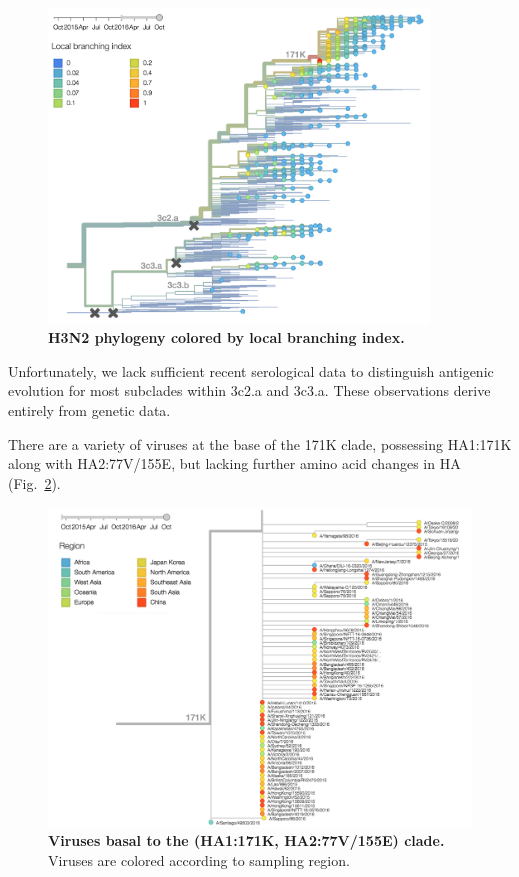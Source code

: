 \documentclass[11pt,oneside,letterpaper]{article}
\begin{document}
\begin{figure}[H]
	\centering
	\includegraphics[width=0.9\textwidth]{../figures/sep-2016/H3N2_LBI.png}
	\caption{\textbf{H3N2 phylogeny colored by local branching index.}
	}
	\label{H3N2_LBI}
\end{figure}

Unfortunately, we lack sufficient recent serological data to distinguish antigenic evolution for most subclades within 3c2.a and 3c3.a. These observations derive entirely from genetic data.

\pagebreak

There are a variety of viruses at the base of the 171K clade, possessing HA1:171K along with HA2:77V/155E, but lacking further amino acid changes in HA (Fig.\ \ref{H3N2_171K_basal}).

\begin{figure}[h!]
	\centering
	\includegraphics[width=1.0\textwidth]{../figures/sep-2016/H3N2_171K_basal.png}
	\caption{\textbf{Viruses basal to the (HA1:171K, HA2:77V/155E) clade.}
	Viruses are colored according to sampling region.
	}
	\label{H3N2_171K_basal}
\end{figure}
\end{document}
